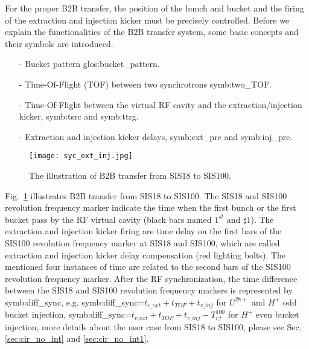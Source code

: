 For the proper B2B transfer, the position of the bunch and bucket and the firing of the extraction and injection kicker must be precisely controlled. Before we explain the functionalities of the B2B transfer system, some basic concepts and their symbols are introduced.

\begin{itemize}
\item[-] Bucket pattern \gls{glos:bucket_pattern}.
\item[-] Time-Of-Flight (\gls{TOF}) between two synchrotrons \gls{symb:two_TOF}. 
\item[-] Time-Of-Flight between the virtual RF cavity and the extraction/injection kicker, \gls{symb:tsrc} and \gls{symb:ttrg}. 
\item[-] Extraction and injection kicker delays, \gls{symb:ext_pre} and \gls{symb:inj_pre}.
\end{itemize}
\begin{figure}[H]
   \centering   
   \texttt{[image: syc\_ext\_inj.jpg]}
   \caption{The illustration of B2B transfer from SIS18 to SIS100.}
   \label{ext_inj_kicker}
\end{figure}
Fig.~\ref{ext_inj_kicker} illustrates B2B transfer from SIS18 to SIS100. The SIS18 and SIS100 revolution frequency marker indicate the time when the first bunch or the first bucket pass by the RF virtual cavity (black bars named $1^{st}$ and $\sharp1$). The extraction and injection kicker firing are time delay on the first bars of the SIS100 revolution frequency marker at SIS18 and SIS100, which are called extraction and injection kicker delay compensation (red lighting bolts). The mentioned four instances of time are related to the second bars of the SIS100 revolution frequency marker. After the RF synchronization, the time difference between the SIS18 and SIS100 revolution frequency markers is represented by \gls{symb:diff_sync}, e.g. \gls{symb:diff_sync}=$t_{v\_ext}+t_{TOF}+t_{v\_inj}$ for $U^{28+}$ and $H^{+}$ odd bucket injection,  \gls{symb:diff_sync}=$t_{v\_ext}+t_{TOF}+t_{v\_inj}- T_{rf}^{100}$ for $H^{+}$ even bucket injection, more details about the user case from SIS18 to SIS100, please see Sec.\ref{sec:cir_no_int} and \ref{sec:cir_no_int1}. 
